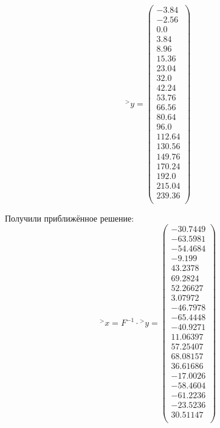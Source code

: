 \documentclass[12pt]{article}
\begin{document}
\begin{equation*}
    {}^>y=\left(
    \begin{array}{cccccccccccccccccccc}
-3.84 \\ -2.56 \\ 0.0 \\ 3.84 \\ 8.96 \\ 15.36 \\ 23.04 \\ 32.0 \\ 42.24 \\ 53.76 \\ 66.56 \\ 80.64 \\ 96.0 \\ 112.64 \\ 130.56 \\ 149.76 \\ 170.24 \\ 192.0 \\ 215.04 \\ 239.36 \\

    \end{array}
    \right)
\end{equation*}

\indent Получили приближённое решение:
\begin{equation*}
    {}^>x=F^{-1} \cdot {}^>y = \left(
    \begin{array}{cccccccccccccccccccc}
-30.7449 \\ -63.5981 \\ -54.4684 \\ -9.199 \\ 43.2378 \\ 69.2824 \\ 52.26627 \\ 3.07972 \\ -46.7978 \\ -65.4448 \\ -40.9271 \\ 11.06397 \\ 57.25407 \\ 68.08157 \\ 36.61686 \\ -17.0026 \\ -58.4604 \\ -61.2236 \\ -23.5236 \\ 30.51147 \\


    \end{array}
    \right)
\end{equation*}
\end{document}
